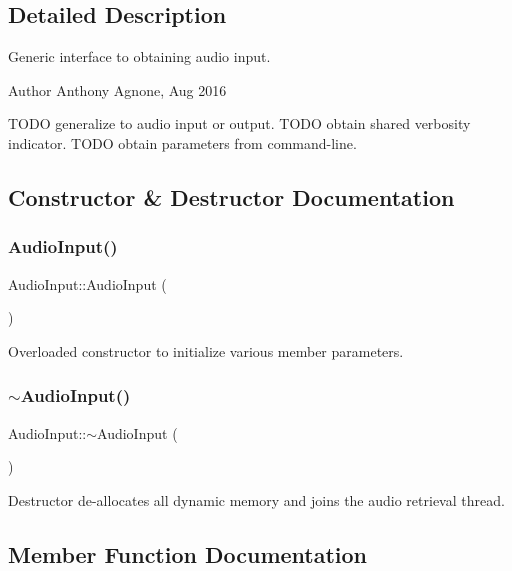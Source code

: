 \subsection{Detailed Description}
Generic interface to obtaining audio input. \begin{DoxyAuthor}{Author}
Anthony Agnone, Aug 2016
\end{DoxyAuthor}
T\+O\+DO generalize to audio input or output. T\+O\+DO obtain shared verbosity indicator. T\+O\+DO obtain parameters from command-\/line. 

\subsection{Constructor \& Destructor Documentation}
\hypertarget{classAudioInput_a51903411fbfb29b77f30a0ee3fbaa50e}{}\label{classAudioInput_a51903411fbfb29b77f30a0ee3fbaa50e} 
\subsubsection{\texorpdfstring{Audio\+Input()}{AudioInput()}}
{\ttfamily Audio\+Input\+::\+Audio\+Input (\begin{DoxyParamCaption}{ }\end{DoxyParamCaption})}

Overloaded constructor to initialize various member parameters. \hypertarget{classAudioInput_aaf278510da0fee4ccfd44c679067d96c}{}\label{classAudioInput_aaf278510da0fee4ccfd44c679067d96c} 
\subsubsection{\texorpdfstring{$\sim$\+Audio\+Input()}{~AudioInput()}}
{\ttfamily Audio\+Input\+::$\sim$\+Audio\+Input (\begin{DoxyParamCaption}{ }\end{DoxyParamCaption})\hspace{0.3cm}{\ttfamily [pure virtual]}}

Destructor de-\/allocates all dynamic memory and joins the audio retrieval thread. 

\subsection{Member Function Documentation}
\hypertarget{classAudioInput_a77614769e39be88bbf5d78adf84d9260}{}\label{classAudioInput_a77614769e39be88bbf5d78adf84d9260} 
